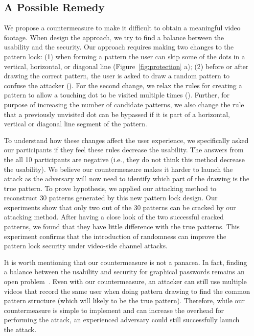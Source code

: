 \subsection{A Possible Remedy}
\label{section: potential-remedy}
We propose a countermeasure to make it difficult to obtain a meaningful video footage.
When design the approach, we try to find a balance between the usability and the security.
Our approach requires making two  changes to the pattern lock: (1) when forming
a pattern the user can skip some of the dots in a vertical, horizontal, or diagonal line (Figure~\ref{fig:protection} a); (2)
before or after drawing the correct pattern, the user is asked to draw a random pattern to confuse the attacker ().
For the second change, we relax the rules for creating a pattern to allow a touching dot to be visited multiple times (). Further, for
purpose of increasing the number of candidate patterns, we also change the rule that a previously unvisited dot can be
bypassed if it is part of a horizontal, vertical or diagonal line segment of the pattern.


To understand how these changes affect the user experience, we specifically asked our participants if they feel these rules decrease
the usability. The answers from the all 10 participants are negative (i.e., they do not think this method decrease the usability).
We believe our countermeasure makes it harder to launch the attack as the adversary will now need to
identify which part of the drawing is the true pattern.
To prove hypothesis, we applied our attacking method to reconstruct 30 patterns generated by this new pattern lock design.
Our experiments show that only two out of the 30 patterns can be cracked by our attacking method.
After having a close look of the two successful cracked patterns, we found that they have little difference with the true patterns.
This experiment confirms that the introduction of randomness can improve the pattern lock security under video-side channel attacks.

It is worth mentioning that our countermeasure is not a panacea. In fact, finding a balance between the
usability and security for graphical passwords remains an open problem~\cite{Abdullah2008Towards}.
Even with our countermeasure, an attacker can still use multiple videos that record the same user when doing pattern
drawing to find the common pattern structure (which will likely to be the true pattern). Therefore, while our
countermeasure is simple to implement and can increase the overhead for performing the attack, an experienced
adversary could still successfully launch the attack.


